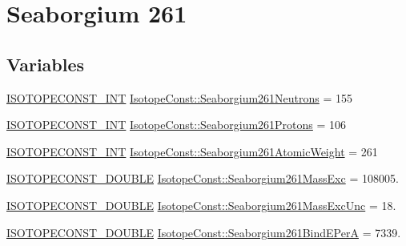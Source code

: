 \hypertarget{group___isotope_const-_seaborgium-_sg261}{}\section{Seaborgium 261}
\label{group___isotope_const-_seaborgium-_sg261}
\subsection*{Variables}
\begin{DoxyCompactItemize}
\item 
\mbox{\hyperlink{group___isotope_const-_macros_ga5f18360b3e99483a35c32d789e62621c}{I\+S\+O\+T\+O\+P\+E\+C\+O\+N\+S\+T\+\_\+\+I\+NT}} \mbox{\hyperlink{group___isotope_const-_seaborgium-_sg261_ga98377a9a34526e4dcefa0e3fecf6f559}{Isotope\+Const\+::\+Seaborgium261\+Neutrons}} = 155
\item 
\mbox{\hyperlink{group___isotope_const-_macros_ga5f18360b3e99483a35c32d789e62621c}{I\+S\+O\+T\+O\+P\+E\+C\+O\+N\+S\+T\+\_\+\+I\+NT}} \mbox{\hyperlink{group___isotope_const-_seaborgium-_sg261_ga618ed53fb30ceb019d1b635131989882}{Isotope\+Const\+::\+Seaborgium261\+Protons}} = 106
\item 
\mbox{\hyperlink{group___isotope_const-_macros_ga5f18360b3e99483a35c32d789e62621c}{I\+S\+O\+T\+O\+P\+E\+C\+O\+N\+S\+T\+\_\+\+I\+NT}} \mbox{\hyperlink{group___isotope_const-_seaborgium-_sg261_gae0dc6fd6728ffd4a883349b1c1b53c80}{Isotope\+Const\+::\+Seaborgium261\+Atomic\+Weight}} = 261
\item 
\mbox{\hyperlink{group___isotope_const-_macros_ga8f45a7272ce02c0b4c65c44636ed719a}{I\+S\+O\+T\+O\+P\+E\+C\+O\+N\+S\+T\+\_\+\+D\+O\+U\+B\+LE}} \mbox{\hyperlink{group___isotope_const-_seaborgium-_sg261_ga548e7c1671b1941726911e57221b737e}{Isotope\+Const\+::\+Seaborgium261\+Mass\+Exc}} = 108005.
\item 
\mbox{\hyperlink{group___isotope_const-_macros_ga8f45a7272ce02c0b4c65c44636ed719a}{I\+S\+O\+T\+O\+P\+E\+C\+O\+N\+S\+T\+\_\+\+D\+O\+U\+B\+LE}} \mbox{\hyperlink{group___isotope_const-_seaborgium-_sg261_ga32ab144afc38e898e79dc094395c2aed}{Isotope\+Const\+::\+Seaborgium261\+Mass\+Exc\+Unc}} = 18.
\item 
\mbox{\hyperlink{group___isotope_const-_macros_ga8f45a7272ce02c0b4c65c44636ed719a}{I\+S\+O\+T\+O\+P\+E\+C\+O\+N\+S\+T\+\_\+\+D\+O\+U\+B\+LE}} \mbox{\hyperlink{group___isotope_const-_seaborgium-_sg261_ga927c033c88f9924dbae184370fe2d882}{Isotope\+Const\+::\+Seaborgium261\+Bind\+E\+PerA}} = 7339.

\end{DoxyCompactItemize}
